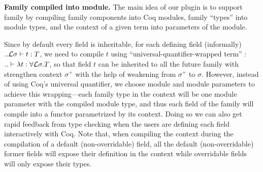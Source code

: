 \textbf{Family compiled into module.} The main idea of our plugin is to support family by compiling
family components into Coq modules, family ``types'' into module types, and the context of a given term
into parameters of the module. 

Since by default every field is inheritable, for each defining field (informally) $ .. {\mathcal{L}}\sigma \vdash t : T $, we need to compile $t$ using
``universal-quantifier-wrapped term'' : $.. \vdash \lambda t : \forall
{\mathcal{L}} \sigma. T$, so that field $t$ can be inherited to all the future family with strengthen context $\sigma^+$ with the help of weakening from $\sigma^+$ to $\sigma$.  However, instead of using Coq's universal quantifier, we choose module and module parameters to achieve this wrapping---each
family type in the context will be one module parameter
with the compiled module type, and thus each field of the family will
compile into a functor parametrized by its context. Doing so we can also
get rapid feedback from type checking when the users are defining each
field interactively with Coq. Note that, when compiling the context during the  compilation of a default (non-overridable)  field, all the default (non-overridable) former fields will expose their definition in the context while overridable fields will only expose their types.
